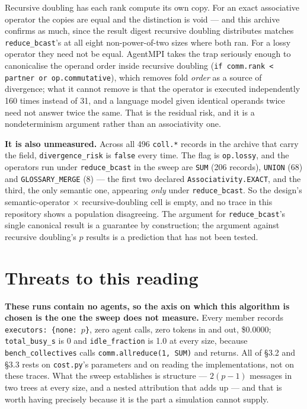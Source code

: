 \documentclass[11pt]{article}
\begin{document}
Recursive doubling has each rank compute its own copy. For an exact associative operator the
copies are equal and the distinction is void --- and this archive confirms as much, since the
result digest recursive doubling distributes matches \texttt{reduce\_bcast}'s at all eight
non-power-of-two sizes where both ran. For a lossy operator they need not be equal. AgentMPI
takes the trap seriously enough to canonicalise the operand order inside recursive doubling
(\texttt{if comm.rank < partner or op.commutative}), which removes fold \emph{order} as a source
of divergence; what it cannot remove is that the operator is executed independently 160 times
instead of 31, and a language model given identical operands twice need not answer twice the
same. That is the residual risk, and it is a nondeterminism argument rather than an
associativity one.

\textbf{It is also unmeasured.} Across all 496 \texttt{coll.*} records in the archive that carry
the field, \texttt{divergence\_risk} is \texttt{false} every time. The flag is
\texttt{op.lossy}, and the operators run under \texttt{reduce\_bcast} in the sweep are
\texttt{SUM} (206 records), \texttt{UNION} (68) and \texttt{GLOSSARY\_MERGE} (8) --- the first
two declared \texttt{Associativity.EXACT}, and the third, the only semantic one, appearing
\emph{only} under \texttt{reduce\_bcast}. So the design's semantic-operator ×
recursive-doubling cell is empty, and no trace in this repository shows a population disagreeing.
The argument for \texttt{reduce\_bcast}'s single canonical result is a guarantee by construction;
the argument against recursive doubling's $p$ results is a prediction that has not been tested.

\section{Threats to this reading}

\textbf{These runs contain no agents, so the axis on which this algorithm is chosen is the one
the sweep does not measure.} Every member records \texttt{executors: \{none: $p$\}}, zero agent
calls, zero tokens in and out, \$0.0000; \texttt{total\_busy\_s} is 0 and
\texttt{idle\_fraction} is 1.0 at every size, because \texttt{bench\_collectives} calls
\texttt{comm.allreduce(1, SUM)} and returns. All of \S3.2 and \S3.3 rests on
\texttt{cost.py}'s parameters and on reading the implementations, not on these traces. What the
sweep establishes is structure --- $2(p-1)$ messages in two trees at every size, and a nested
attribution that adds up --- and that is worth having precisely because it is the part a
simulation cannot supply.
\end{document}
